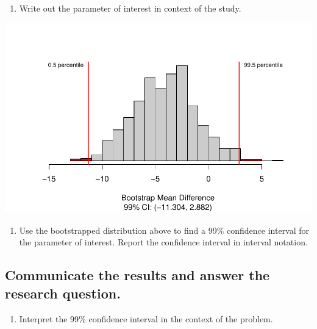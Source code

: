 \documentclass[
]{report}
\providecommand{\tightlist}{%
  \setlength{\itemsep}{0pt}\setlength{\parskip}{0pt}}
\begin{document}
\vspace{.5in}

\begin{enumerate}
\def\labelenumi{\arabic{enumi}.}
\setcounter{enumi}{15}
\tightlist
\item
  Write out the parameter of interest in context of the study.
\end{enumerate}

\vspace{1in}

\begin{center}\includegraphics[width=0.7\linewidth]{08-paired_files/figure-latex/unnamed-chunk-6-1} \end{center}

\begin{enumerate}
\def\labelenumi{\arabic{enumi}.}
\setcounter{enumi}{16}
\tightlist
\item
  Use the bootstrapped distribution above to find a 99\% confidence interval for the parameter of interest. Report the confidence interval in interval notation.
\end{enumerate}

\vspace{.3in}

\hypertarget{communicate-the-results-and-answer-the-research-question.}{%
\subsection{Communicate the results and answer the research question.}\label{communicate-the-results-and-answer-the-research-question.}}

\begin{enumerate}
\def\labelenumi{\arabic{enumi}.}
\setcounter{enumi}{17}
\tightlist
\item
  Interpret the 99\% confidence interval in the context of the problem.
\end{enumerate}
\end{document}
